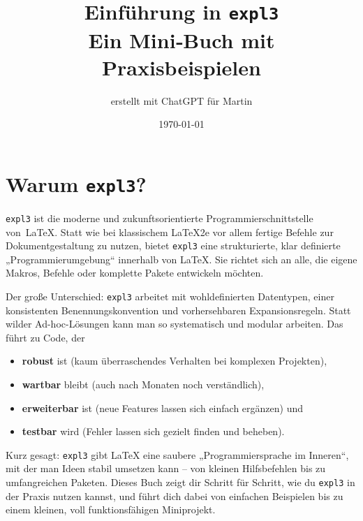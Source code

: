 \documentclass[11pt,a4paper]{book}
\begin{document}
\title{Einführung in \texttt{expl3}\\\large Ein Mini‑Buch mit Praxisbeispielen}

\author{erstellt mit ChatGPT für Martin}

\date{\today}

\maketitle

\tableofcontents



\chapter{Warum \texttt{expl3}?}

\noindent

\texttt{expl3} ist die moderne und zukunftsorientierte Programmierschnittstelle von~LaTeX. Statt wie bei klassischem LaTeX2e vor allem fertige Befehle zur Dokumentgestaltung zu nutzen, bietet \texttt{expl3} eine strukturierte, klar definierte „Programmierumgebung“ innerhalb von LaTeX. Sie richtet sich an alle, die eigene Makros, Befehle oder komplette Pakete entwickeln möchten.

\medskip

Der große Unterschied: \texttt{expl3} arbeitet mit wohldefinierten Datentypen, einer konsistenten Benennungskonvention und vorhersehbaren Expansionsregeln. Statt wilder Ad-hoc-Lösungen kann man so systematisch und modular arbeiten. Das führt zu Code, der
\begin{itemize}
\item \textbf{robust} ist (kaum überraschendes Verhalten bei komplexen Projekten),
\item \textbf{wartbar} bleibt (auch nach Monaten noch verständlich),
\item \textbf{erweiterbar} ist (neue Features lassen sich einfach ergänzen) und
\item \textbf{testbar} wird (Fehler lassen sich gezielt finden und beheben).
\end{itemize}

\medskip

Kurz gesagt: \texttt{expl3} gibt LaTeX eine saubere „Programmiersprache im Inneren“, mit der man Ideen stabil umsetzen kann – von kleinen Hilfsbefehlen bis zu umfangreichen Paketen. Dieses Buch zeigt dir Schritt für Schritt, wie du \texttt{expl3} in der Praxis nutzen kannst, und führt dich dabei von einfachen Beispielen bis zu einem kleinen, voll funktionsfähigen Miniprojekt.
\end{document}

